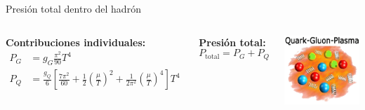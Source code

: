 \documentclass{beamer}
\begin{document}
\begin{frame}{Presión total dentro del hadrón}
  \begin{columns}
    \textbf{Contribuciones individuales:}
    \begin{align*}
      P_G &= g_G \frac{\pi^2}{90} T^4 \\
      P_Q &= \frac{g_Q}{6} \left[ \frac{7\pi^2}{60}
      + \frac{1}{2} \left( \frac{\mu}{T} \right)^2
      + \frac{1}{2\pi^2} \left( \frac{\mu}{T} \right)^4 \right] T^4
    \end{align*}

    \vspace{1em}
    \textbf{Presión total:}
    \begin{equation*}
      P_{\text{total}} = P_G + P_Q
    \end{equation*}

    \centering
    \includegraphics[width=\linewidth]{figures/QG-plasma.png}
  \end{columns}
\end{frame}
\end{document}
